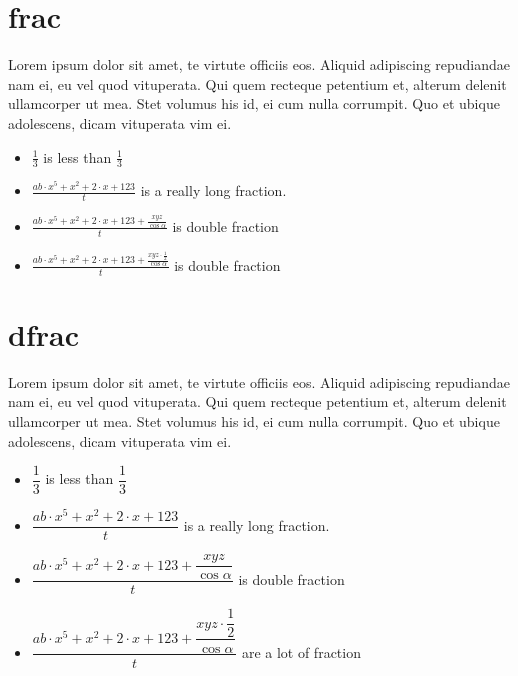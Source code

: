 \documentclass[a4paper,9pt]{scrartcl}
\begin{document}
\section{frac}
Lorem ipsum dolor sit amet, te virtute officiis eos. Aliquid 
adipiscing repudiandae nam ei, eu vel quod vituperata. Qui quem 
recteque petentium et, alterum delenit ullamcorper ut mea. Stet 
volumus his id, ei cum nulla corrumpit. Quo et ubique adolescens, 
dicam vituperata vim ei.

    \begin{itemize}
      \item $\frac{1}{3}$ is less than $\frac{1}{3}$
      \item $\frac{ab \cdot x^5 + x^2 + 2 \cdot x + 123}{t}$ is a really long fraction.
      \item $\frac{ab \cdot x^5 + x^2 + 2 \cdot x + 123 + \frac{xyz}{\cos \alpha}}{t}$ is double fraction
      \item $\frac{ab \cdot x^5 + x^2 + 2 \cdot x + 123 + \frac{xyz \cdot \frac{1}{2}}{\cos \alpha}}{t}$ is double fraction
    \end{itemize}

\section{dfrac}
Lorem ipsum dolor sit amet, te virtute officiis eos. Aliquid 
adipiscing repudiandae nam ei, eu vel quod vituperata. Qui quem 
recteque petentium et, alterum delenit ullamcorper ut mea. Stet 
volumus his id, ei cum nulla corrumpit. Quo et ubique adolescens, 
dicam vituperata vim ei.

    \begin{itemize}
      \item $\dfrac{1}{3}$ is less than $\dfrac{1}{3}$
      \item $\dfrac{ab \cdot x^5 + x^2 + 2 \cdot x + 123}{t}$ is a really long fraction.
      \item $\dfrac{ab \cdot x^5 + x^2 + 2 \cdot x + 123 + \dfrac{xyz}{\cos \alpha}}{t}$ is double fraction
      \item $\dfrac{ab \cdot x^5 + x^2 + 2 \cdot x + 123 + \dfrac{xyz \cdot \dfrac{1}{2}}{\cos \alpha}}{t}$ are a lot of fraction
    \end{itemize}
\end{document}
